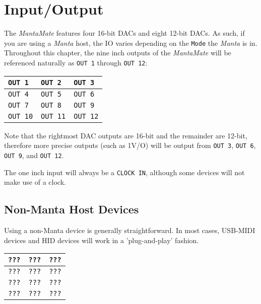 \renewcommand{\chaptername}{Section}
\chapter{Input/Output}

\begin{intro}
  The \emph{MantaMate} features four 16-bit DACs and eight 12-bit DACs. As such, if
  you are using a \emph{Manta} host, the IO varies depending on the
  \texttt{Mode} the \emph{Manta} is in. Throughout this chapter, the nine 
  inch outputs
  of the \emph{MantaMate} will be referenced naturally as \texttt{OUT 1} through
  \texttt{OUT 12}:

  \begin{center}
  \begin{tabular}{ | m{1.5cm} | m{1.5cm}| m{1.5cm} | }
    \hline
    \texttt{OUT 1} & \texttt{OUT 2} & \texttt{OUT 3} \\
    \hline
    \texttt{OUT 4} & \texttt{OUT 5} & \texttt{OUT 6} \\
    \hline
    \texttt{OUT 7} & \texttt{OUT 8} & \texttt{OUT 9} \\
    \hline
    \texttt{OUT 10} & \texttt{OUT 11} & \texttt{OUT 12} \\
    \hline
  \end{tabular}
  \end{center}

  Note that the rightmost DAC outputs are 16-bit and the remainder are 12-bit,
  therefore more precise outputs (such as 1V/O) will be output from  \texttt{OUT 3},
   \texttt{OUT 6},  \texttt{OUT 9}, and \texttt{OUT 12}.

  The one  inch input will always be a \texttt{CLOCK IN}, although
  some devices will not make use of a clock.
\end{intro}

\section{Non-Manta Host Devices}
  Using a non-Manta device is generally straightforward. In most cases,
  USB-MIDI devices and HID devices will work in a 'plug-and-play' fashion.

  \begin{center}
  \begin{tabular}{ | m{1.5cm} | m{1.5cm}| m{1.5cm} | }
    \hline
    \texttt{???} & \texttt{???} & \texttt{???} \\
    \hline
    \texttt{???} & \texttt{???} & \texttt{???} \\
    \hline
    \texttt{???} & \texttt{???} & \texttt{???} \\
    \hline
    \texttt{???} & \texttt{???} & \texttt{???} \\
    \hline
  \end{tabular}
  \end{center}

